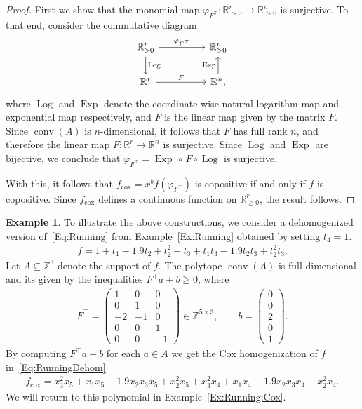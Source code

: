 \documentclass[a4paper,11pt]{amsart}
\theoremstyle{definition}
\newtheorem{example}[theorem]{Example}
\DeclareMathOperator{\conv}{conv}
\DeclareMathOperator{\Log}{Log}
\DeclareMathOperator{\Exp}{Exp}
\newcommand{\ZZ}{\mathbb{Z}}
\newcommand{\RR}{\mathbb{R}}
\newcommand{\cox}{\mathrm{cox}}
\begin{document}
\begin{proof}
First we show that the monomial map $\varphi_{F^\top}\colon \mathbb{R}^r_{>0} \to \mathbb{R}^n_{>0}$ is surjective. To that end, consider the commutative diagram
     \begin{equation*}
                  \begin{tikzcd}
\RR_{>0}^r\arrow[rr,"\varphi_{F^\top}"]\arrow[d,"\Log"] & & \RR^n_{>0} \\
           \RR^r \arrow[rr,"F"]  & & \RR^n\arrow[u,"\Exp"],
         \end{tikzcd}
     \end{equation*}
where $\Log$ and $\Exp$ denote the coordinate-wise natural logarithm map and exponential map respectively, and $F$ is the linear map given by the matrix $F$. Since $\conv(A)$ is $n$-dimensional, it follows that $F$ has full rank $n$, and therefore the linear map $F\colon \RR^r \to \RR^n$ is surjective. Since $\Log$ and $\Exp$ are bijective, we conclude that $\varphi_{F^\top} = \Exp \, \circ \, F \circ \Log$ is surjective.

With this, it follows that $f_{\cox} = x^b f(\varphi_{F^\top})$ is copositive if and only if $f$ is copositive. Since $f_\cox$ defines a continuous function on $\RR^r_{\geq0}$, the result follows. \end{proof}


\begin{example}
\label{Ex:RunningDehom}
    To illustrate the above constructions, we consider a dehomogenized version of~\eqref{Eq:Running} from Example~\ref{Ex:Running} obtained by setting $t_4 = 1$. 
      \begin{align}
        \label{Eq:RunningDehom}
         f = 1+t_1 - 1.9t_2 + t_2^2  +t_3 + t_1t_3-1.9t_2t_3+t_2^2t_3.
    \end{align}
    Let $A \subseteq \ZZ^3$ denote the support of $f$.
The polytope $\conv(A)$ is full-dimensional and its given by the inequalities $F^\top a + b \geq 0$, where
\begin{align*}
    F^\top=\begin{pmatrix}
        1 & 0 & 0 \\
        0 & 1 & 0 \\
        -2 & -1 & 0 \\
        0 & 0 & 1 \\
        0 & 0 & -1
    \end{pmatrix} \in \mathbb{Z}^{5 \times 3},\qquad  b=\begin{pmatrix}
        0 \\ 0 \\2\\0\\1
    \end{pmatrix}.
\end{align*}
By computing $F^\top a+b$ for each $a \in A$ we get the Cox homogenization of $f$ in~\eqref{Eq:RunningDehom}
\begin{align}
\label{Eq:RunningCoxDehom}
f_\cox = x_3^2x_5 + x_1x_5 -1.9 x_2x_3x_5 + x_2^2x_5+x_3^2x_4 + x_1x_4-1.9x_2x_3x_4+x_2^2x_4.
 \end{align}
 We will return to this polynomial in Example~\ref{Ex:Running:Cox}.
\end{example}
\end{document}
